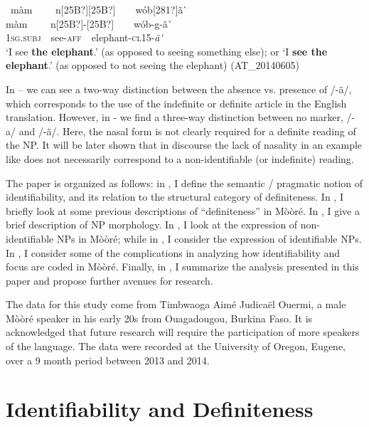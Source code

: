 \documentclass[output=paper]{langsci/langscibook}
\begin{document}
\ea\label{ex:teo:5}
\label{bkm:Ref264213606}\ m\`{a}m \ \ \ \ n[25B?][25B?]\ \ \ \ w\'{o}b[281?]\~{a}\`{ }\\
\gll m\`{a}m \ \ \ \ n[25B?]\nobreakdash-[25B?]\ \ \ \ w\'{o}b-g\nobreakdash-\~{a}\`{ }\\
\textsc{1sg.subj\ \ }see-\textsc{aff}\ \ elephant-\textsc{cl15-}\textit{\~{a}\'{ }}\\
\glt ‘I see \textbf{the elephant}.’ (as opposed to seeing something else); or ‘I \textbf{see the elephant}.’ (as opposed to not seeing the elephant) (AT\_20140605)
\z

In  –  we can see a two-way distinction between the absence vs. presence of /\nobreakdash-\~{a}/, which corresponds to the use of the indefinite or definite article in the English translation. However, in - we find a three-way distinction between no marker, /-a/ and /-\~{a}/. Here, the nasal form is not clearly required for a definite reading of the NP. It will be later shown that in discourse the lack of nasality in an example like  does not necessarily correspond to a non-identifiable (or indefinite) reading.

The paper is organized as follows: in , I define the semantic / pragmatic notion of identifiability, and its relation to the structural category of definiteness. In , I briefly look at some previous descriptions of “definiteness” in Mòòr\'{e}. In , I give a brief description of NP morphology. In , I look at the expression of non-identifiable NPs in M\`{o}\`{o}r\'{e}; while in , I consider the expression of identifiable NPs. In , I consider some of the complications in analyzing how identifiability and focus are coded in Mòòré. Finally, in , I summarize the analysis presented in this paper and propose further avenues for research.

The data for this study come from Timbwaoga Aim\'{e} Judica\"{e}l Ouermi, a male M\`{o}\`{o}r\'{e} speaker in his early 20s from Ouagadougou, Burkina Faso. It is acknowledged that future research will require the participation of more speakers of the language. The data were recorded at the University of Oregon, Eugene, over a 9 month period between 2013 and 2014. 


\section{Identifiability and Definiteness}\label{sec:teo:2}
\end{document}
